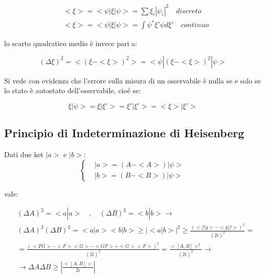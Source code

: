 \documentclass{article}
\begin{document}
\begin{equation}
    \begin{aligned}
         & <\xi>= <\psi|\xi|\psi>= \sum \xi_i |\psi_i|^2 \quad discreto     \\
         & <\xi>= <\psi|\xi|\psi>= \int \psi^*\xi'\psi d\xi' \quad continuo
    \end{aligned}
\end{equation}

lo scarto quadratico medio è invece pari a:

\begin{equation}
    (\Delta \xi)^2=<(\xi-<\xi>)^2>= <\psi|(\xi-<\xi>)^2|\psi>
\end{equation}

Si vede con evidenza che l'errore sulla misura di un osservabile è nulla se e solo se lo stato è autostato dell'osservabile, cioé se:

\begin{equation}
    \xi |\psi>= \xi |\xi'>= \xi' |\xi'>= <\xi>|\xi'>
\end{equation}




\subsection{Principio di Indeterminazione di Heisenberg}
Dati due ket $|a>$ e $|b>$:
\begin{equation}
    \left\{
    \begin{aligned}
         & |a>=(A-<A>)|\psi> \\
         & |b>=(B-<B>)|\psi>
    \end{aligned}
    \right.
\end{equation}

vale:

\begin{equation}
    \begin{aligned}
         & (\Delta A)^2=<a|a> \quad , \quad (\Delta B)^2=<b|b> \rightarrow                         \\
         & (\Delta A)^2(\Delta B)^2=<a|a><b|b> \geq |<a|b>|^2 \geq \frac{(<f|g>-<g|f>)^2}{(2i)^2}= \\
         & =\frac{(<FG>-<F><G>-<GF>+<G><F>)^2}{(2i)^2}=\frac{<[A,B]>^2}{(2i)^2} \rightarrow        \\
         & \rightarrow \Delta A \Delta B \geq |\frac{<[A,B]>}{2i}|
    \end{aligned}
\end{equation}
\end{document}
